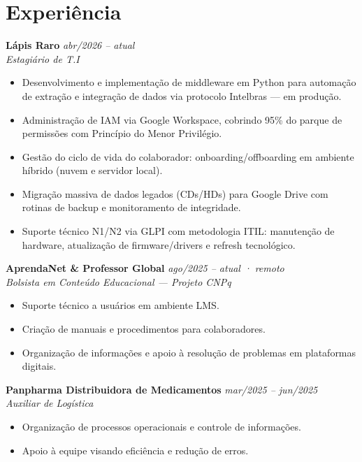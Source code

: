 \documentclass[11pt,a4paper]{article}
\begin{document}
\section{Experiência}

\textbf{Lápis Raro} \hfill \textit{abr/2026 -- atual}\\
\textit{Estagiário de T.I}
\begin{itemize}
  \item Desenvolvimento e implementação de middleware em Python para automação de extração e
        integração de dados via protocolo Intelbras --- em produção.
  \item Administração de IAM via Google Workspace, cobrindo 95\% do parque de permissões com
        Princípio do Menor Privilégio.
  \item Gestão do ciclo de vida do colaborador: onboarding/offboarding em ambiente híbrido
        (nuvem e servidor local).
  \item Migração massiva de dados legados (CDs/HDs) para Google Drive com rotinas de backup
        e monitoramento de integridade.
  \item Suporte técnico N1/N2 via GLPI com metodologia ITIL: manutenção de hardware,
        atualização de firmware/drivers e refresh tecnológico.
\end{itemize}

\medskip

\textbf{AprendaNet \& Professor Global} \hfill \textit{ago/2025 -- atual · remoto}\\
\textit{Bolsista em Conteúdo Educacional --- Projeto CNPq}
\begin{itemize}
  \item Suporte técnico a usuários em ambiente LMS.
  \item Criação de manuais e procedimentos para colaboradores.
  \item Organização de informações e apoio à resolução de problemas em plataformas digitais.
\end{itemize}

\medskip

\textbf{Panpharma Distribuidora de Medicamentos} \hfill \textit{mar/2025 -- jun/2025}\\
\textit{Auxiliar de Logística}
\begin{itemize}
  \item Organização de processos operacionais e controle de informações.
  \item Apoio à equipe visando eficiência e redução de erros.
\end{itemize}
\end{document}
